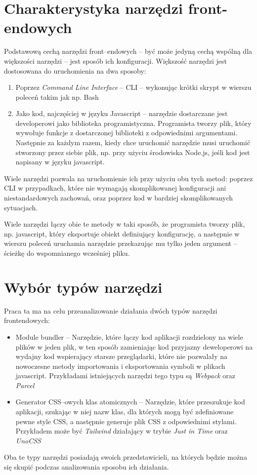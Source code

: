 \documentclass{SGGW-thesis}
\begin{document}
\section{Charakterystyka narzędzi front-endowych}
Podstawową cechą narzędzi front--endowych -- być może jedyną cechą wspólną dla większości narzędzi -- jest sposób ich konfiguracji. Większość narzędzi jest dostosowana do uruchomienia na dwa sposoby:
\begin{enumerate}
    \item Poprzez \emph{Command Line Interface} -- CLI -- wykonując krótki skrypt w wierszu poleceń takim jak np. Bash
    \item Jako kod, najczęściej w języku Javascript -- narzędzie dostarczane jest developerowi jako biblioteka programistyczna. Programista tworzy plik, który wywołuje funkcje z dostarczonej biblioteki z odpowiednimi argumentami. Następnie za każdym razem, kiedy chce uruchomić narzędzie musi uruchomić stworzony przez siebie plik, np. przy użyciu środowiska Node.js, jeśli kod jest napisany w języku javascript.
\end{enumerate}
Wiele narzędzi pozwala na uruchomienie ich przy użyciu obu tych metod: poprzez CLI w przypadkach, które nie wymagają skomplikowanej konfiguracji ani niestandardowych zachowań, oraz poprzez kod w bardziej skomplikowanych sytuacjach.

Wiele narzędzi łączy obie te metody w taki sposób, że programista tworzy plik, np. javascript, który eksportuje obiekt definiujący konfigurację, a następnie w wierszu poleceń uruchamia narzędzie przekazując mu tylko jeden argument -- ścieżkę do wspomnianego wcześniej pliku.

\section{Wybór typów narzędzi}
Praca ta ma na celu przeanalizowanie działania dwóch typów narzędzi frontendowych:
\begin{itemize}
    \item Module bundler -- Narzędzie, które łączy kod aplikacji rozdzielony na wiele plików w jeden plik, w ten sposób zamieniając kod przyjazny deweloperowi na wydajny kod wspierający starsze przeglądarki, które nie pozwalały na nowoczesne metody importowania i eksportowania symboli w plikach javascript. Przykładami istniejących narzędzi tego typu są \emph{Webpack} oraz \emph{Parcel}
    \item Generator CSS--owych klas atomicznych -- Narzędzie, które przeszukuje kod aplikacji, szukając w niej nazw klas, dla których mogą być zdefiniowane pewne style CSS, a następnie generuje plik CSS z odpowiednimi stylami. Przykładem może być \emph{Tailwind\cite{Tailwind_jit}} działający w trybie \emph{Just in Time} oraz \emph{UnoCSS\cite{unocss}}
\end{itemize}
Oba te typy narzędzi posiadają swoich przedstawicieli, na których będzie można się skupić podczas analizowania sposobu ich działania.
\end{document}
